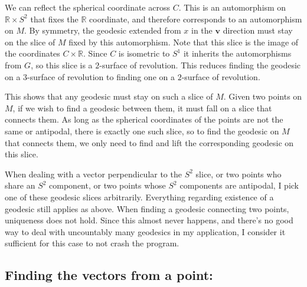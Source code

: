 We can reflect the spherical coordinate across $C$. This is an automorphism on $\mathbb{R} \times S^2$ that fixes the $\mathbb{R}$ coordinate, and therefore corresponds to an automorphism on $M$. By symmetry, the geodesic extended from $x$ in the $\textbf{v}$ direction must stay on the slice of $M$ fixed by this automorphism. Note that this slice is the image of the coordinates $C \times \mathbb{R}$. Since $C$ is isometric to $S^1$ it inherits the automorphisms from $G$, so this slice is a $2$-surface of revolution. This reduces finding the geodesic on a $3$-surface of revolution to finding one on a $2$-surface of revolution.

This shows that any geodesic must stay on such a slice of $M$. Given two points on $M$, if we wish to find a geodesic between them, it must fall on a slice that connects them. As long as the spherical coordinates of the points are not the same or antipodal, there is exactly one such slice, so to find the geodesic on $M$ that connects them, we only need to find and lift the corresponding geodesic on this slice.

\begin{remark}
When dealing with a vector perpendicular to the $S^2$ slice, or two points who share an $S^2$ component, or two points whose $S^2$ components are antipodal, I pick one of these geodesic slices arbitrarily. Everything regarding existence of a geodesic still applies as above. When finding a geodesic connecting two points, uniqueness does not hold. Since this almost never happens, and there's no good way to deal with uncountably many geodesics in my application, I consider it sufficient for this case to not crash the program.
\end{remark}



\bigskip

\subsection{Finding the vectors from a point:}

